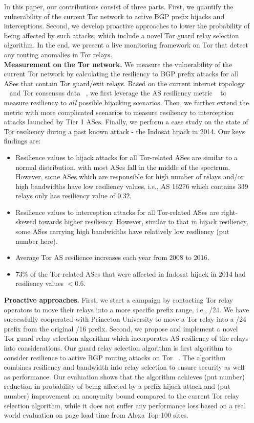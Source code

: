 In this paper, our contributions consist of three parts. First, we quantify the vulnerability of the current Tor network to active BGP prefix hijacks and interceptions. Second, we develop proactive approaches to lower the probability of being affected by such attacks, which include a novel Tor guard relay selection algorithm. In the end, we present a live monitoring framework on Tor that detect any routing anomalies in Tor relays. 
\\
\textbf{Measurement on the Tor network.} We measure the vulnerability of the current Tor network by calculating the resiliency to BGP prefix attacks for all ASes that contain Tor guard/exit relays. Based on the current internet topology ~\cite{topology} and Tor consensus data ~\cite{torconsensus}, we first leverage the AS resiliency metric ~\cite{lad2007understanding} to measure resiliency to \emph{all} possible hijacking scenarios. Then, we further extend the metric with more complicated scenarios to measure resiliency to interception attacks launched by Tier 1 ASes. Finally, we perform a case study on the state of Tor resiliency during a past known attack - the Indosat hijack in 2014. Our keys findings are:
\begin{itemize}
\item Resilience values to hijack attacks for all Tor-related ASes are similar to a normal distribution, with most ASes fall in the middle of the spectrum. However, some ASes which are responsible for high number of relays and/or high bandwidths have low resiliency values, i.e., AS 16276 which contains 339 relays only has resiliency value of 0.32. 
\item Resilience values to interception attacks for all Tor-related ASes are right-skewed towards higher resiliency. However, similar to that in hijack resiliency, some ASes carrying high bandwidths have relatively low resiliency (put number here). 
\item Average Tor AS resilience increases each year from 2008 to 2016. 
\item 73\% of the Tor-related ASes that were affected in Indosat hijack in 2014 had resiliency values $< 0.6$.
\end{itemize}
\textbf{Proactive approaches.} First, we start a campaign by contacting Tor relay operators to move their relays into a more specific prefix range, i.e., /24. We have successfully cooperated with Princeton University to move a Tor relay into a /24 prefix from the original /16 prefix. Second, we propose and implement a novel Tor guard relay selection algorithm which incorporates AS resiliency of the relays into considerations. Our guard relay selection algorithm is first algorithm to consider resilience to active BGP routing attacks on Tor ~\cite{sun2015raptor}. The algorithm combines resiliency and bandwidth into relay selection to ensure security as well as performance. Our evaluation shows that the algorithm achieves (put number) reduction in probability of being affected by a prefix hijack attack and (put number) improvement on anonymity bound compared to the current Tor relay selection algorithm, while it does not suffer any performance loss based on a real world evaluation on page load time from Alexa Top 100 sites. 
